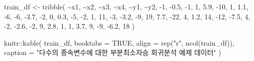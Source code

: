 \documentclass[
]{book}
\newenvironment{Shaded}{\begin{snugshade}}{\end{snugshade}}
\newcommand{\AttributeTok}[1]{\textcolor[rgb]{0.77,0.63,0.00}{#1}}
\newcommand{\ConstantTok}[1]{\textcolor[rgb]{0.00,0.00,0.00}{#1}}
\newcommand{\DecValTok}[1]{\textcolor[rgb]{0.00,0.00,0.81}{#1}}
\newcommand{\FloatTok}[1]{\textcolor[rgb]{0.00,0.00,0.81}{#1}}
\newcommand{\FunctionTok}[1]{\textcolor[rgb]{0.00,0.00,0.00}{#1}}
\newcommand{\NormalTok}[1]{#1}
\newcommand{\OtherTok}[1]{\textcolor[rgb]{0.56,0.35,0.01}{#1}}
\newcommand{\SpecialCharTok}[1]{\textcolor[rgb]{0.00,0.00,0.00}{#1}}
\newcommand{\StringTok}[1]{\textcolor[rgb]{0.31,0.60,0.02}{#1}}
\begin{document}
\begin{Shaded}
\begin{Highlighting}[]
\NormalTok{train\_df }\OtherTok{\textless{}{-}} \FunctionTok{tribble}\NormalTok{(}
  \SpecialCharTok{\textasciitilde{}}\NormalTok{x1, }\SpecialCharTok{\textasciitilde{}}\NormalTok{x2, }\SpecialCharTok{\textasciitilde{}}\NormalTok{x3, }\SpecialCharTok{\textasciitilde{}}\NormalTok{x4, }\SpecialCharTok{\textasciitilde{}}\NormalTok{y1, }\SpecialCharTok{\textasciitilde{}}\NormalTok{y2,}
  \SpecialCharTok{{-}}\DecValTok{1}\NormalTok{, }\SpecialCharTok{{-}}\FloatTok{0.5}\NormalTok{, }\SpecialCharTok{{-}}\DecValTok{1}\NormalTok{, }\DecValTok{1}\NormalTok{, }\FloatTok{5.9}\NormalTok{, }\SpecialCharTok{{-}}\DecValTok{10}\NormalTok{,}
  \DecValTok{1}\NormalTok{, }\FloatTok{1.1}\NormalTok{, }\SpecialCharTok{{-}}\DecValTok{6}\NormalTok{, }\SpecialCharTok{{-}}\DecValTok{6}\NormalTok{, }\SpecialCharTok{{-}}\FloatTok{3.7}\NormalTok{, }\SpecialCharTok{{-}}\DecValTok{2}\NormalTok{,}
  \DecValTok{0}\NormalTok{, }\FloatTok{0.3}\NormalTok{, }\SpecialCharTok{{-}}\DecValTok{5}\NormalTok{, }\SpecialCharTok{{-}}\DecValTok{2}\NormalTok{, }\DecValTok{1}\NormalTok{, }\DecValTok{11}\NormalTok{,}
  \SpecialCharTok{{-}}\DecValTok{3}\NormalTok{, }\SpecialCharTok{{-}}\FloatTok{3.2}\NormalTok{, }\SpecialCharTok{{-}}\DecValTok{9}\NormalTok{, }\DecValTok{19}\NormalTok{, }\FloatTok{7.7}\NormalTok{, }\SpecialCharTok{{-}}\DecValTok{22}\NormalTok{,}
  \DecValTok{4}\NormalTok{, }\FloatTok{1.2}\NormalTok{, }\DecValTok{14}\NormalTok{, }\SpecialCharTok{{-}}\DecValTok{12}\NormalTok{, }\SpecialCharTok{{-}}\FloatTok{7.5}\NormalTok{, }\DecValTok{4}\NormalTok{,}
  \SpecialCharTok{{-}}\DecValTok{2}\NormalTok{, }\SpecialCharTok{{-}}\FloatTok{2.6}\NormalTok{, }\SpecialCharTok{{-}}\DecValTok{2}\NormalTok{, }\DecValTok{9}\NormalTok{, }\FloatTok{2.8}\NormalTok{, }\DecValTok{1}\NormalTok{,}
  \DecValTok{1}\NormalTok{, }\FloatTok{3.7}\NormalTok{, }\DecValTok{9}\NormalTok{, }\SpecialCharTok{{-}}\DecValTok{9}\NormalTok{, }\SpecialCharTok{{-}}\FloatTok{6.2}\NormalTok{, }\DecValTok{18}
\NormalTok{)}

\NormalTok{knitr}\SpecialCharTok{::}\FunctionTok{kable}\NormalTok{(}
\NormalTok{  train\_df, }\AttributeTok{booktabs =} \ConstantTok{TRUE}\NormalTok{,}
  \AttributeTok{align =} \FunctionTok{rep}\NormalTok{(}\StringTok{"r"}\NormalTok{, }\FunctionTok{ncol}\NormalTok{(train\_df)),}
  \AttributeTok{caption =} \StringTok{"다수의 종속변수에 대한 부분최소자승 회귀분석 예제 데이터"}
\NormalTok{)}
\end{Highlighting}
\end{Shaded}
\end{document}
